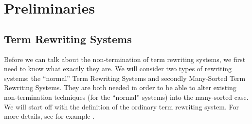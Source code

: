 \chapter{Preliminaries}\label{preliminaries}

\section{Term Rewriting Systems}
Before we can talk about the non-termination of term rewriting systems, we first need to know what exactly they are. We will consider two types of rewriting systems: the ``normal'' Term Rewriting Systems and secondly Many-Sorted Term Rewriting Systems. They are both needed in order to be able to alter existing non-termination techniques (for the ``normal'' systems) into the many-sorted case. We will start off with the definition of the ordinary term rewriting system. For more details, see for example \cite{Klop:1993:TRS:162552.162559}.
